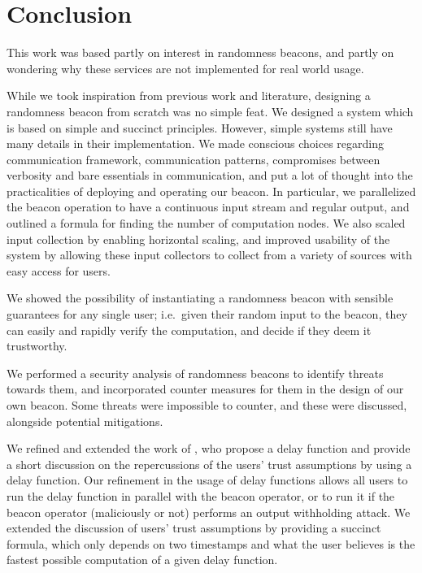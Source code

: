 \section{Conclusion}%
\label{sec:conclusion}

This work was based partly on interest in randomness beacons, and partly on wondering why these services are not implemented for real world usage.

While we took inspiration from previous work and literature, designing a randomness beacon from scratch was no simple feat.
We designed a system which is based on simple and succinct principles.
However, simple systems still have many details in their implementation.
We made conscious choices regarding communication framework, communication patterns, compromises between verbosity and bare essentials in communication, and put a lot of thought into the practicalities of deploying and operating our beacon.
In particular, we parallelized the beacon operation to have a continuous input stream and regular output, and outlined a formula for finding the number of computation nodes.
We also scaled input collection by enabling horizontal scaling, and improved usability of the system by allowing these input collectors to collect from a variety of sources with easy access for users.

We showed the possibility of instantiating a randomness beacon with sensible guarantees for any single user; i.e.\ given their random input to the beacon, they can easily and rapidly verify the computation, and decide if they deem it trustworthy.

We performed a security analysis of randomness beacons to identify threats towards them, and incorporated counter measures for them in the design of our own beacon.
Some threats were impossible to counter, and these were discussed, alongside potential mitigations.

We refined and extended the work of \citet{randomzoo}, who propose a delay function and provide a short discussion on the repercussions of the users' trust assumptions by using a delay function.
Our refinement in the usage of delay functions allows all users to run the delay function in parallel with the beacon operator, or to run it if the beacon operator (maliciously or not) performs an output withholding attack.
We extended the discussion of users' trust assumptions by providing a succinct formula, which only depends on two timestamps and what the user believes is the fastest possible computation of a given delay function.

